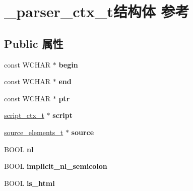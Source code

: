 \hypertarget{struct__parser__ctx__t}{}\section{\+\_\+parser\+\_\+ctx\+\_\+t结构体 参考}
\label{struct__parser__ctx__t}
\subsection*{Public 属性}
\begin{DoxyCompactItemize}
\item 
\mbox{\label{struct__parser__ctx__t_aed4581ec27654267beb128588c77af30}} 
const W\+C\+H\+AR $\ast$ {\bfseries begin}
\item 
\mbox{\label{struct__parser__ctx__t_af18d412e79f73e6f4b9a7361b010836d}} 
const W\+C\+H\+AR $\ast$ {\bfseries end}
\item 
\mbox{\label{struct__parser__ctx__t_a3e90e10127227317026e10bf066e9744}} 
const W\+C\+H\+AR $\ast$ {\bfseries ptr}
\item 
\mbox{\label{struct__parser__ctx__t_a37b0651e79b42c3c37de46e1543ae766}} 
\hyperlink{struct__script__ctx__t}{script\+\_\+ctx\+\_\+t} $\ast$ {\bfseries script}
\item 
\mbox{\label{struct__parser__ctx__t_a28419e929d087a47d16b4fcaf053e8fc}} 
\hyperlink{struct__source__elements__t}{source\+\_\+elements\+\_\+t} $\ast$ {\bfseries source}
\item 
\mbox{\label{struct__parser__ctx__t_a83aa811b2a63ac8813e01a23ec7df470}} 
B\+O\+OL {\bfseries nl}
\item 
\mbox{\label{struct__parser__ctx__t_aaa6d4488e83b767ba6d44d3cc310b4d2}} 
B\+O\+OL {\bfseries implicit\+\_\+nl\+\_\+semicolon}
\item 
\mbox{\label{struct__parser__ctx__t_a406db8666935d2f1a81f0aaf020142db}} 
B\+O\+OL {\bfseries is\+\_\+html}
\item 
\mbox{\label{struct__parser__ctx__t_acec1aacc300bb3c719f478b553e67ada}} 

\end{DoxyCompactItemize}

